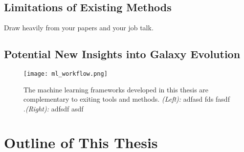 \subsection{Limitations of Existing Methods} \label{sec_intro:limitations}

Draw heavily from your papers and your job talk.

\subsection{Potential New Insights into Galaxy Evolution} \label{sec_intro:opportunities}


\begin{figure}[htbp]
    \centering
    \texttt{[image: ml\_workflow.png]}
    \caption{The machine learning frameworks developed in this thesis are complementary to exiting tools and methods. \textit{(Left):} adfasd fds fasdf .\textit{(Right):} adfsdf asdf }
    \label{fig_intro:ml_workflow}
\end{figure}




\section{Outline of This Thesis} \label{sec_intro:outstanding_challenges}